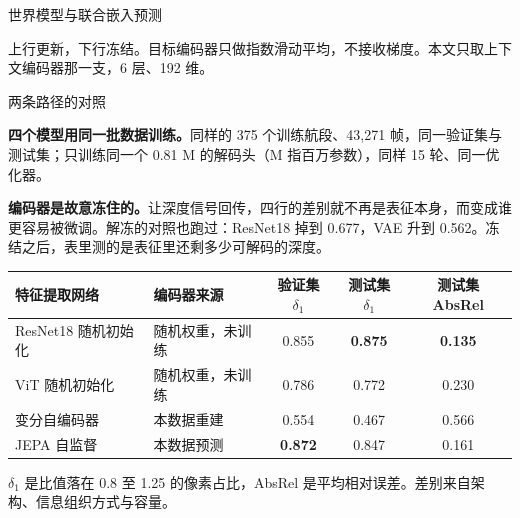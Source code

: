 \documentclass[serif, aspectratio=169]{beamer}
\newcommand{\currentref}{}
\newcommand{\src}[1]{\gdef\currentref{#1}}
\begin{document}
\begin{frame}{世界模型与联合嵌入预测}
\begin{center}

{\scriptsize 上行更新，下行冻结。目标编码器只做指数滑动平均，不接收梯度。本文只取上下文编码器那一支，6 层、192 维。}
\end{center}

\src{LeCun Y. A Path Towards Autonomous Machine Intelligence. OpenReview, 2022.}
\end{frame}

\begin{frame}{两条路径的对照}

{\footnotesize \textbf{四个模型用同一批数据训练。}同样的 375 个训练航段、43,271 帧，同一验证集与测试集；只训练同一个 0.81 M 的解码头（M 指百万参数），同样 15 轮、同一优化器。}

\vspace{0.1cm}
{\footnotesize \textbf{编码器是故意冻住的。}让深度信号回传，四行的差别就不再是表征本身，而变成谁更容易被微调。解冻的对照也跑过：ResNet18 掉到 0.677，VAE 升到 0.562。冻结之后，表里测的是表征里还剩多少可解码的深度。}

\vspace{0.25cm}
\begin{table}[]
\centering
\footnotesize
\begin{tabular}{@{}llccc@{}}
\toprule
特征提取网络 & 编码器来源 & 验证集 $\delta_1$ & 测试集 $\delta_1$ & 测试集 AbsRel \\
\midrule
ResNet18 随机初始化 & 随机权重，未训练 & 0.855 & \textbf{0.875} & \textbf{0.135} \\
ViT 随机初始化 & 随机权重，未训练 & 0.786 & 0.772 & 0.230 \\
变分自编码器 & 本数据重建 & 0.554 & 0.467 & 0.566 \\
JEPA 自监督 & 本数据预测 & \textbf{0.872} & 0.847 & 0.161 \\
\bottomrule
\end{tabular}
\end{table}

\vspace{0.05cm}
{\scriptsize $\delta_1$ 是比值落在 0.8 至 1.25 的像素占比，AbsRel 是平均相对误差。差别来自架构、信息组织方式与容量。}

\src{Dosovitskiy A, Beyer L, Kolesnikov A, et al. An Image is Worth 16x16 Words: Transformers for Image Recognition at Scale. ICLR, 2021.}
\end{frame}
\end{document}
